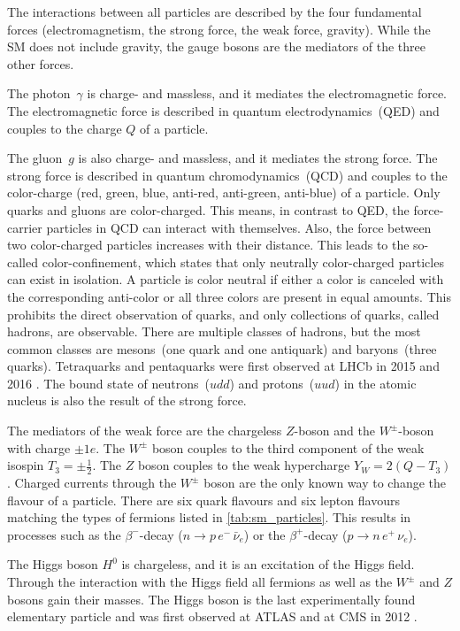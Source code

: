 The interactions between all particles are described by the four fundamental forces (electromagnetism, the strong force, the weak force, gravity).
While the SM does not include gravity, the gauge bosons are the mediators of the three other forces.

The photon~$\gamma$ is charge- and massless, and it mediates the electromagnetic force.
The electromagnetic force is described in quantum electrodynamics~(QED) and couples to the charge $Q$ of a particle.

The gluon~$g$ is also charge- and massless, and it mediates the strong force.
The strong force is described in quantum chromodynamics~(QCD) and couples to the color-charge (red, green, blue, anti-red, anti-green, anti-blue) of a particle.
Only quarks and gluons are color-charged.
This means, in contrast to QED, the force-carrier particles in QCD can interact with themselves.
Also, the force between two color-charged particles increases with their distance.
This leads to the so-called color-confinement, which states that only neutrally color-charged particles can exist in isolation.
A particle is color neutral if either a color is canceled with the corresponding anti-color or all three colors are present in equal amounts.
This prohibits the direct observation of quarks, and only collections of quarks, called hadrons, are observable.
There are multiple classes of hadrons, but the most common classes are mesons~(one quark and one antiquark) and baryons~(three quarks).
Tetraquarks and pentaquarks were first observed at LHCb in 2015 and 2016 \cite{TetraquarkLHCb,PentaquarkLHCb}. 
The bound state of neutrons~($udd$) and protons~($uud$) in the atomic nucleus is also the result of the strong force.

The mediators of the weak force are the chargeless $Z$-boson and the $W^\pm$-boson with charge $\pm 1e$.
The $W^\pm$ boson couples to the third component of the weak isospin $T_3 = \pm\frac{1}{2}$.
The $Z$ boson couples to the weak hypercharge $Y_W = 2(Q - T_3)$.
Charged currents through the $W^\pm$ boson are the only known way to change the flavour of a particle.
There are six quark flavours and six lepton flavours matching the types of fermions listed in \cref{tab:sm_particles}.
This results in processes such as the $\beta^-$-decay ($n \rightarrow p \, e^- \, \bar{\nu}_e$) or the $\beta^+$-decay ($p \rightarrow n \, e^+ \, \nu_e$).

The Higgs boson $H^0$ is chargeless, and it is an excitation of the Higgs field.
Through the interaction with the Higgs field all fermions as well as the $W^\pm$ and $Z$ bosons gain their masses.
The Higgs boson is the last experimentally found elementary particle and was first observed at ATLAS and at CMS in 2012 \cite{HiggsATLAS,HiggsCMS}. 
